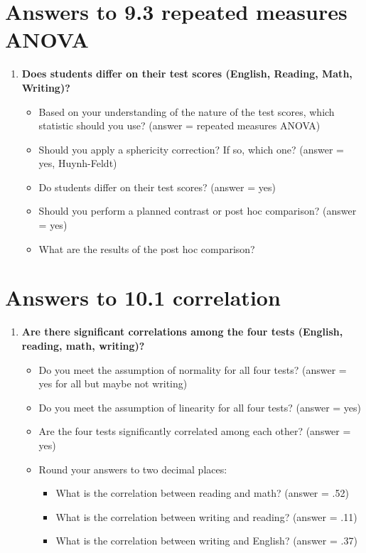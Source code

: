 \documentclass[
]{book}
\begin{document}
\hypertarget{answers-to-9.3-repeated-measures-anova}{%
\section{Answers to 9.3 repeated measures ANOVA}\label{answers-to-9.3-repeated-measures-anova}}

\begin{enumerate}
\def\labelenumi{\arabic{enumi}.}
\item
  \textbf{Does students differ on their test scores (English, Reading, Math, Writing)?}

  \begin{itemize}
  \item
    Based on your understanding of the nature of the test scores, which statistic should you use? (answer = repeated measures ANOVA)
  \item
    Should you apply a sphericity correction? If so, which one? (answer = yes, Huynh-Feldt)
  \item
    Do students differ on their test scores? (answer = yes)
  \item
    Should you perform a planned contrast or post hoc comparison? (answer = yes)
  \item
    What are the results of the post hoc comparison?
  \end{itemize}
\end{enumerate}

\hypertarget{answers-to-10.1-correlation}{%
\section{Answers to 10.1 correlation}\label{answers-to-10.1-correlation}}

\begin{enumerate}
\def\labelenumi{\arabic{enumi}.}
\item
  \textbf{Are there significant correlations among the four tests (English, reading, math, writing)?}

  \begin{itemize}
  \item
    Do you meet the assumption of normality for all four tests? (answer = yes for all but maybe not writing)
  \item
    Do you meet the assumption of linearity for all four tests? (answer = yes)
  \item
    Are the four tests significantly correlated among each other? (answer = yes)
  \item
    Round your answers to two decimal places:

    \begin{itemize}
    \item
      What is the correlation between reading and math? (answer = .52)
    \item
      What is the correlation between writing and reading? (answer = .11)
    \item
      What is the correlation between writing and English? (answer = .37)
    \end{itemize}
  \end{itemize}
\end{enumerate}
\end{document}
